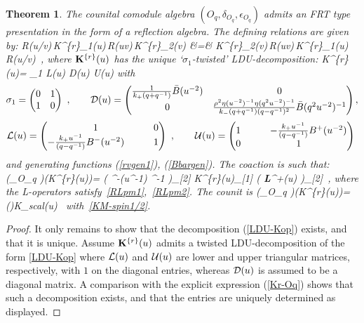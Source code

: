 \documentclass[11pt]{amsart}
\numberwithin{equation}{section}
\newtheorem{thm}{Theorem}[section]
\numberwithin{equation}{section}
\begin{document}
\begin{thm} \label{thm:FRTOqDr} The counital  comodule algebra $(O_q,\delta_{O_q},\epsilon_{O_q})$ admits an FRT type presentation in the form of a reflection algebra. The defining relations are given by:
	\beqa 
	R(u/v)\,{\bold K}^{\{r\}}_1(u)\,R(uv)\,{\bold K}^{\{r\}}_2(v)
	&=& {\bold K}^{\{r\}}_2(v)\,R(uv)\,{\bold K}^{\{r\}}_1(u)\,R(u/v)\ ,
	\nonumber
	\eeqa
	where	${\bold K}^{\{r\}}(u)$ has the unique `$\sigma_1$-twisted' LDU-decomposition: 
	\beqa
	{\bold K}^{\{r\}}(u)= \sigma_1  {\cal L}(u) {\cal D}(u) {\cal U}(u) \label{LDU-Kop}
	\eeqa
	with
	\begin{equation}
		\sigma_1= \begin{pmatrix} 0 & 1 \\ 1 & 0  \end{pmatrix}\ ,\qquad  {\cal D}(u)  =    \begin{pmatrix} \frac{1}{k_+(q+q^{-1})}{\bar B}(u^{-2})   & 0 \\  0 &  \frac  {\rho^2\eta(u^{-2})^{-1}\eta(q^{2}u^{-2})^{-1}}{k_-(q+q^{-1})(q-q^{-1})^2}{\bar B}(q^2u^{-2})^{-1} \end{pmatrix}  ,\nonumber
	\end{equation}
	\begin{equation}
		{\cal L}(u)=	\begin{pmatrix} 1 & 0\\  -\frac{k_+u^{-1}}{(q-q^{-1})}B^-(u^{-2}) \qquad & 1  \end{pmatrix}\ ,\qquad  {\cal U}(u)= \begin{pmatrix} 1 & \qquad -\frac{k_+u^{-1}}{(q-q^{-1})}B^+(u^{-2})\\  0 & 1 \end{pmatrix}\ \nonumber
	\end{equation}	
	\normalsize
	and generating functions (\ref{rvgen1}), (\ref{Bbargen}).  The coaction is such that:
	\beqa
	(\delta_{O_q} \otimes \id)({\bold K}^{\{r\}}(u))= \left ( ^{-}(u^{-1}) \rbrack^{-1} \right)_{[2]}  
		{\bold K}^{\{r\}}(u)_{[1]} \left(  {\bf L}^+(u) \right)_{[2]}\ ,\nonumber
	\eeqa
	where the L-operators satisfy~\eqref{RLpm1},~\eqref{RLpm2}.
	The counit is  
	\beqa
	(\epsilon_{O_q} \otimes \id)({\bold K}^{\{r\}}(u))=\left(\right)K_{scal}(u)\  \nonumber
	\eeqa
	with~\eqref{KM-spin1/2}.
\end{thm}
\begin{proof}
It only remains to show that the decomposition (\ref{LDU-Kop}) exists, and that it is unique.  Assume ${\bold K}^{\{r\}}(u)$ admits a twisted  LDU-decomposition of the form \eqref{LDU-Kop} where ${\cal L}(u)$ and ${\cal U}(u)$ are lower  and upper triangular matrices, respectively, with $1$ on the diagonal entries, whereas  ${\cal D}(u)$ is assumed to be a diagonal matrix. A comparison with the explicit expression (\ref{Kr-Oq}) shows that such a decomposition exists, and that the entries are uniquely determined as displayed. 
	\end{proof}
\end{document}
